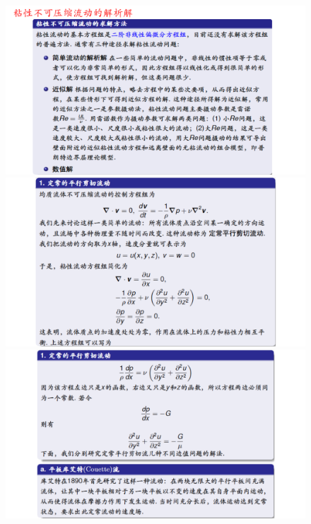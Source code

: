 \documentclass[UTF8,12pt]{article}
\begin{document}
\begin{figure}[h]
    \centering
    \includegraphics[width=.8\linewidth]{img/cal-2018_06_Page1.png}
    \includegraphics[width=.8\linewidth]{img/cal-2018_06_Page2.png}
    \includegraphics[width=.8\linewidth]{img/cal-2018_06_Page3.png}

\end{figure}
\end{document}
